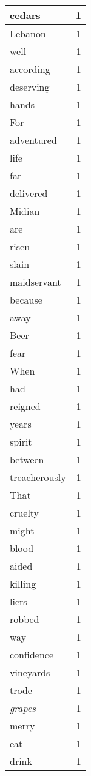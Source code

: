 \begin{center}
\begin{longtable}{l|r}
cedars & 1\\ \hline 
Lebanon & 1\\ \hline 
well & 1\\ \hline 
according & 1\\ \hline 
deserving & 1\\ \hline 
hands & 1\\ \hline 
For & 1\\ \hline 
adventured & 1\\ \hline 
life & 1\\ \hline 
far & 1\\ \hline 
delivered & 1\\ \hline 
Midian & 1\\ \hline 
are & 1\\ \hline 
risen & 1\\ \hline 
slain & 1\\ \hline 
maidservant & 1\\ \hline 
because & 1\\ \hline 
away & 1\\ \hline 
Beer & 1\\ \hline 
fear & 1\\ \hline 
When & 1\\ \hline 
had & 1\\ \hline 
reigned & 1\\ \hline 
years & 1\\ \hline 
spirit & 1\\ \hline 
between & 1\\ \hline 
treacherously & 1\\ \hline 
That & 1\\ \hline 
cruelty & 1\\ \hline 
might & 1\\ \hline 
blood & 1\\ \hline 
aided & 1\\ \hline 
killing & 1\\ \hline 
liers & 1\\ \hline 
robbed & 1\\ \hline 
way & 1\\ \hline 
confidence & 1\\ \hline 
vineyards & 1\\ \hline 
trode & 1\\ \hline 
\emph{grapes} & 1\\ \hline 
merry & 1\\ \hline 
eat & 1\\ \hline 
drink & 1\\ \hline 

\end{longtable}
\end{center}
